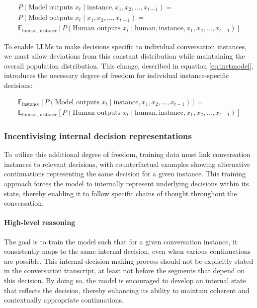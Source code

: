 \documentclass{article}
\begin{document}
\begin{equation}
\label{eq:popmodel}
\begin{gathered}
P(\text{Model outputs } x_t \mid \text{instance}, x_1, x_2, ..., x_{t-1}) = \\
P(\text{Model outputs } x_t \mid x_1, x_2, ..., x_{t-1}) = \\
\mathbb{E}_{\text{human, instance}}[P(\text{Human outputs } x_t \mid \text{human}, \text{instance}, x_1, x_2, ..., x_{t-1})]
\end{gathered}
\end{equation}

To enable LLMs to make decisions specific to individual conversation instances, we must allow deviations from this constant distribution while maintaining the overall population distribution. This change, described in equation \ref{eq:instmodel}, introduces the necessary degree of freedom for individual instance-specific decisions:

\begin{equation}
\label{eq:instmodel}
\begin{gathered}
\mathbb{E}_{\text{instance}}[P(\text{Model outputs } x_t \mid \text{instance}, x_1, x_2, ..., x_{t-1})] = \\
\mathbb{E}_{\text{human, instance}}[P(\text{Human outputs } x_t \mid \text{human}, \text{instance}, x_1, x_2, ..., x_{t-1})]
\end{gathered}
\end{equation}

\subsubsection{Incentivising internal decision representations}
To utilize this additional degree of freedom, training data must link conversation instances to relevant decisions, with counterfactual examples showing alternative continuations representing the same decision for a given instance. This training approach forces the model to internally represent underlying decisions within its state, thereby enabling it to follow specific chains of thought throughout the conversation. 

\paragraph{High-level reasoning}
The goal is to train the model such that for a given conversation instance, it consistently maps to the same internal decision, even when various continuations are possible. This internal decision-making process should not be explicitly stated in the conversation transcript, at least not before the segments that depend on this decision. By doing so, the model is encouraged to develop an internal state that reflects the decision, thereby enhancing its ability to maintain coherent and contextually appropriate continuations.
\end{document}
